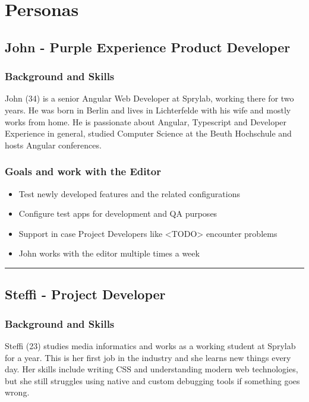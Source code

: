 
\chapter{Personas}
\label{app:personas}


\section{John - Purple Experience Product Developer}
\label{subsec:persona:productdev}
\subsection{Background and Skills}
John (34) is a senior Angular Web Developer at Sprylab, working there for two years. He was born in Berlin and lives in Lichterfelde with his wife and mostly works from home. He is passionate about Angular, Typescript and Developer Experience in general, studied Computer Science at the Beuth Hochschule and hosts Angular conferences.
\\
\subsection{Goals and work with the Editor}
\begin{itemize}
  \item Test newly developed features and the related configurations
  \item Configure test apps for development and QA purposes
  \item Support in case Project Developers like <TODO> encounter problems
  \item John works with the editor multiple times a week
\end{itemize}

\hrule
\section{Steffi - Project Developer}
\label{subsec:persona:projectdev}
\subsection{Background and Skills}
Steffi (23) studies media informatics and works as a working student at Sprylab for a year. This is her first job in the industry and she learns new things every day. Her skills include writing CSS and understanding modern web technologies, but she still struggles using native and custom debugging tools if something goes wrong.  
\\
